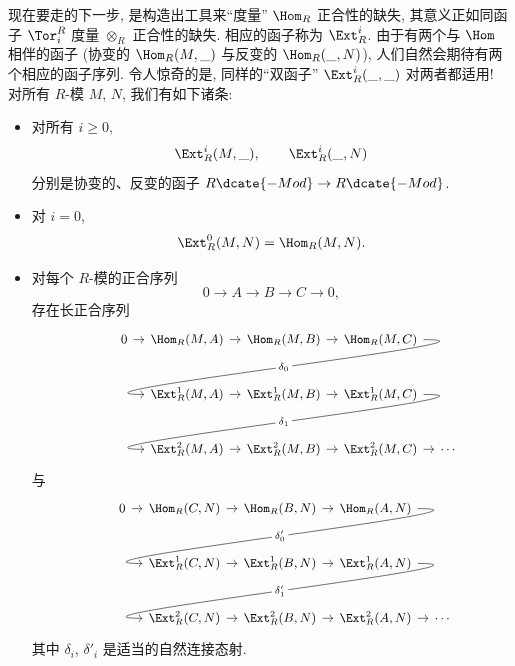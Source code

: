 现在要走的下一步, 是构造出工具来``度量'' $\Hom_R$ 正合性的缺失, 其意义正如同函子 $\Tor_i^R$ 度量 $\otimes_R$ 正合性的缺失. 相应的函子称为 $\Ext_R^i$. 由于有两个与 $\Hom$ 相伴的函子 (协变的 $\Hom_R(M,\_)$ 与反变的 $\Hom_R(\_,N)$), 人们自然会期待有两个相应的函子序列. 令人惊奇的是, 同样的``双函子'' $\Ext_R^i(\_,\_)$ 对两者都适用! 对所有 $R$-模 $M$, $N$, 我们有如下诸条:
\begin{itemize}
\item 对所有 $i\ge 0$,
\[
\Ext_R^i(M,\_),\qquad \Ext_R^i(\_,N)
\]
分别是协变的、反变的函子 $R\dcate{-Mod}\to R\dcate{-Mod}$.
\item 对 $i=0$,
\[
\Ext_R^0(M,N)=\Hom_R(M,N).
\]
\item 对每个 $R$-模的正合序列
\[
0\longrightarrow A\longrightarrow B\longrightarrow C\longrightarrow 0,
\]
存在长正合序列
\[
\begin{tikzcd}[column sep=.8em,row sep=2.2em,font=\small]
0 \ar[r] & \Hom_R(M,A) \ar[r] & \Hom_R(M,B) \ar[r] & \Hom_R(M,C) \ar[dll,out=0,in=180,looseness=1,"\delta_0" description] & {} \\
{} & \Ext_R^{1}(M,A) \ar[r] & \Ext_R^{1}(M,B) \ar[r] & \Ext_R^{1}(M,C) \ar[dll,out=0,in=180,looseness=1,"\delta_1" description] & {} \\
{} & \Ext_R^{2}(M,A) \ar[r] & \Ext_R^{2}(M,B) \ar[r] & \Ext_R^{2}(M,C) \ar[r] & \cdots
\end{tikzcd}
\]
与
\[
\begin{tikzcd}[column sep=.8em,row sep=2.2em,font=\small]
0 \ar[r] & \Hom_R(C,N) \ar[r] & \Hom_R(B,N) \ar[r] & \Hom_R(A,N) \ar[dll,out=0,in=180,looseness=1,"\delta'_0" description] & {} \\
{} & \Ext_R^{1}(C,N) \ar[r] & \Ext_R^{1}(B,N) \ar[r] & \Ext_R^{1}(A,N) \ar[dll,out=0,in=180,looseness=1,"\delta'_1" description] & {} \\
{} & \Ext_R^{2}(C,N) \ar[r] & \Ext_R^{2}(B,N) \ar[r] & \Ext_R^{2}(A,N) \ar[r] & \cdots
\end{tikzcd}
\]
其中 $\delta_i$, $\delta'_i$ 是适当的自然连接态射.
\end{itemize}

